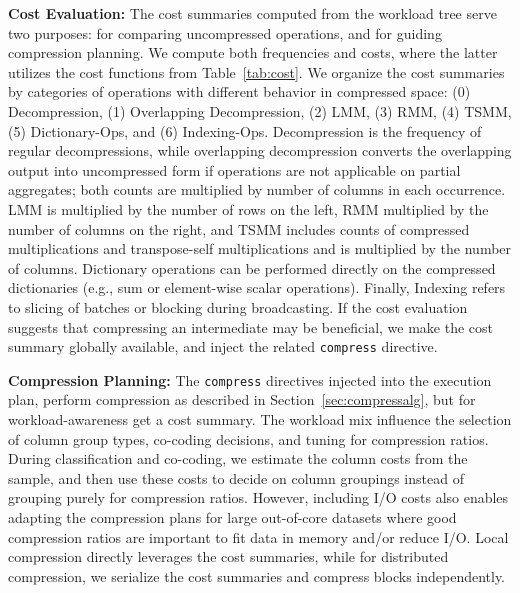 \textbf{Cost Evaluation:}
The cost summaries computed from the workload tree serve two purposes: for comparing uncompressed operations,
and for guiding compression planning.
We compute both frequencies and costs, where the latter utilizes the cost functions from Table~\ref{tab:cost}.
We organize the cost summaries by categories of operations with different behavior in compressed space: (0) Decompression, (1) Overlapping Decompression, (2) LMM, (3) RMM, (4) TSMM, (5) Dictionary-Ops, and (6) Indexing-Ops.
Decompression is the frequency of regular decompressions,
while overlapping decompression converts the overlapping output into uncompressed form if operations
are not applicable on partial aggregates; both counts are multiplied by number of columns in each occurrence.
LMM is multiplied by the number of rows on the left, RMM multiplied by the number of columns on the right, and TSMM includes counts of compressed multiplications and transpose-self multiplications and is multiplied by the number of columns.
Dictionary operations can be performed directly on the compressed dictionaries (e.g., sum or element-wise scalar operations).
Finally, Indexing refers to slicing of batches or blocking during broadcasting.
If the cost evaluation suggests that compressing an intermediate may be beneficial, we make the cost summary globally available, and inject the related \texttt{compress} directive.

\textbf{Compression Planning:}
The \texttt{compress} directives injected into the execution plan, perform compression as described in Section~\ref{sec:compressalg}, but for workload-awareness get a cost summary. The workload mix influence the selection of column group types, co-coding decisions, and tuning for compression ratios.
During classification and co-coding, we estimate the column costs from the sample, and then use these costs to decide on column groupings instead of grouping purely for compression ratios.
However, including I/O costs also enables adapting the compression plans for large out-of-core datasets where good compression ratios are important to fit data in memory and/or reduce I/O. Local compression directly leverages the cost summaries, while for distributed compression, we serialize the cost summaries and compress blocks independently.

